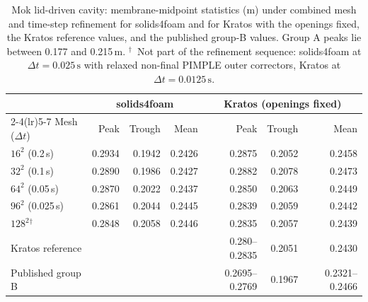 \begin{table}[htbp]
	\centering
	\small
	\setlength{\tabcolsep}{5pt}
	\caption{Mok lid-driven cavity: membrane-midpoint statistics (m) under combined mesh and time-step refinement for solids4foam and for Kratos with the openings fixed, the Kratos reference values, and the published group-B values. Group A peaks lie between 0.177 and 0.215\,m. $^\dagger$~Not part of the refinement sequence: solids4foam at $\Delta t = 0.025\,\mathrm{s}$ with relaxed non-final PIMPLE outer correctors, Kratos at $\Delta t = 0.0125\,\mathrm{s}$.}
	\label{tab:mok}
	\begin{tabular}{lrrrrrr}
		\toprule
		& \multicolumn{3}{c}{solids4foam} & \multicolumn{3}{c}{Kratos (openings fixed)} \\
		\cmidrule(lr){2-4}\cmidrule(lr){5-7}
		Mesh ($\Delta t$) & Peak & Trough & Mean & Peak & Trough & Mean \\
		\midrule
		$16^2$ (0.2\,s) & 0.2934 & 0.1942 & 0.2426 & 0.2875 & 0.2052 & 0.2458 \\
		$32^2$ (0.1\,s) & 0.2890 & 0.1986 & 0.2427 & 0.2882 & 0.2078 & 0.2473 \\
		$64^2$ (0.05\,s) & 0.2870 & 0.2022 & 0.2437 & 0.2850 & 0.2063 & 0.2449 \\
		$96^2$ (0.025\,s) & 0.2861 & 0.2044 & 0.2445 & 0.2839 & 0.2059 & 0.2442 \\
		$128^2$$^\dagger$ & 0.2848 & 0.2058 & 0.2446 & 0.2835 & 0.2057 & 0.2439 \\
		\midrule
		Kratos reference & & & & 0.280--0.2835 & 0.2051 & 0.2430 \\
		Published group B & & & & 0.2695--0.2769 & 0.1967 & 0.2321--0.2466 \\
		\bottomrule
	\end{tabular}
\end{table}

